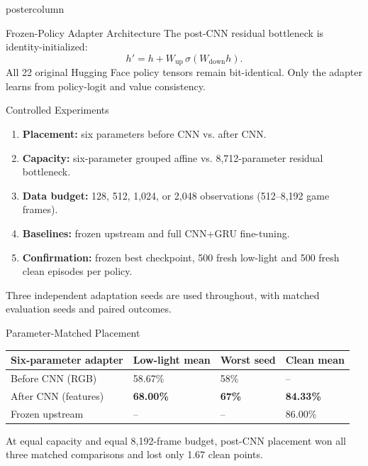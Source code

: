 \documentclass{beamer}
\begin{document}
\begin{frame}
\begin{columns}
\begin{column}{.48\textwidth}
\begin{beamercolorbox}[center]{postercolumn}
\begin{minipage}{.98\textwidth}
{\begin{myblock}{Frozen-Policy Adapter Architecture}
      \vspace{0.5cm}
      The post-CNN residual bottleneck is identity-initialized:
      \[
      h' = h + W_{\mathrm{up}}\,\sigma(W_{\mathrm{down}}h).
      \]
      All 22 original Hugging Face policy tensors remain bit-identical. Only the adapter learns from policy-logit and value consistency.
      \end{myblock}\vfill

      \begin{myblock}{Controlled Experiments}
      \begin{enumerate}
        \item \textbf{Placement:} six parameters before CNN vs. after CNN.
        \item \textbf{Capacity:} six-parameter grouped affine vs. 8,712-parameter residual bottleneck.
        \item \textbf{Data budget:} 128, 512, 1,024, or 2,048 observations (512--8,192 game frames).
        \item \textbf{Baselines:} frozen upstream and full CNN+GRU fine-tuning.
        \item \textbf{Confirmation:} frozen best checkpoint, 500 fresh low-light and 500 fresh clean episodes per policy.
      \end{enumerate}
      Three independent adaptation seeds are used throughout, with matched evaluation seeds and paired outcomes.
      \end{myblock}\vfill

      \begin{myblock}{Parameter-Matched Placement}
      \begin{table}
      \centering
      \begin{tabularx}{\linewidth}{lZZZ}
      \toprule
      \textbf{Six-parameter adapter} & \textbf{Low-light mean} & \textbf{Worst seed} & \textbf{Clean mean}\\
      \midrule
      Before CNN (RGB) & 58.67\% & 58\% & --\\
      After CNN (features) & \textbf{68.00\%} & \textbf{67\%} & \textbf{84.33\%}\\
      Frozen upstream & -- & -- & 86.00\%\\
      \bottomrule
      \end{tabularx}
      \end{table}
      At equal capacity and equal 8,192-frame budget, post-CNN placement won all three matched comparisons and lost only 1.67 clean points.
      \end{myblock}

}
\end{minipage}
\end{beamercolorbox}
\end{column}
\end{columns}
\end{frame}
\end{document}
